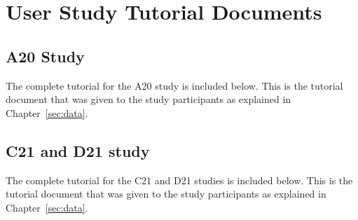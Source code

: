 \section{User Study Tutorial Documents}
\label{app:tutorial}

\subsection{A20 Study}
The complete tutorial for the A20 study is included below. This is the tutorial document that was given to the study participants as explained in Chapter~\ref{sec:data}.


\subsection{C21 and D21 study}
The complete tutorial for the C21 and D21 studies is included below. This is the tutorial document that was given to the study participants as explained in Chapter~\ref{sec:data}.
